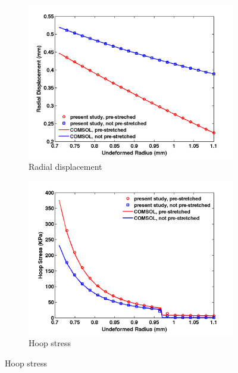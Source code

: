 \begin{figure}[H]
	\begin{subfigure}[b]{0.5\textwidth}
		\centering
		\includegraphics[width=\textwidth]{./figures/artery_ur.png}
		\caption{Radial displacement}
		\label{ur_artery}
	\end{subfigure}
	\begin{subfigure}[b]{0.5\textwidth}
		\centering
		\includegraphics[width=\textwidth]{./figures/artery_hoop.png}
		\caption{Hoop stress}
		\label{hoop_artery}
	\end{subfigure}
	

\end{figure}
